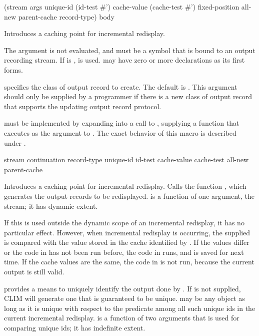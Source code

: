  {(stream
                              \rest args
                              \key unique-id (id-test \#')
                                   cache-value (cache-test \#')
                                   fixed-position all-new parent-cache
                                   record-type)
                             \body body}

Introduces a caching point for incremental redisplay.  

The  argument is not evaluated, and must be a symbol that is bound to
an output recording stream.  If  is ,  is
used.   may have zero or more declarations as its first forms.

 specifies the class of output record to create.  The default
is .  This argument should only be supplied
by a programmer if there is a new class of output record that supports the
updating output record protocol.

 must be implemented by expanding into a call to
, supplying a function that executes  as
the  argument to .  The exact
behavior of this macro is described under .

 {stream continuation record-type
                                      unique-id id-test
                                      cache-value cache-test
                                      \key all-new parent-cache}

Introduces a caching point for incremental redisplay.  Calls the function
, which generates the output records to be redisplayed.
 is a function of one argument, the stream; it has dynamic
extent.

If this is used outside the dynamic scope of an incremental redisplay, it has no
particular effect.  However, when incremental redisplay is occurring, the
supplied  is compared with the value stored in the cache
identified by .  If the values differ or the code in 
has not been run before, the code in  runs, and  is
saved for next time.  If the cache values are the same, the code in 
is not run, because the current output is still valid.

 provides a means to uniquely identify the output done by
.  If  is not supplied, CLIM will generate one that is
guaranteed to be unique.   may be any object as long as it is
unique with respect to the  predicate among all such unique ids in
the current incremental redisplay.   is a function of two arguments
that is used for comparing unique ids; it has indefinite extent.

